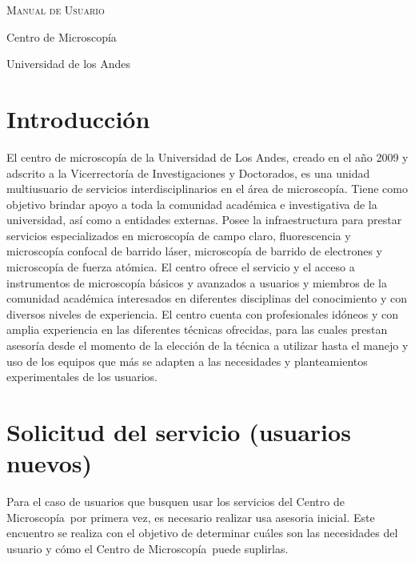 \documentclass[11pt, letter-size]{article}
\newcommand{\centro}{Centro de Microscop\'ia}
\begin{document}
	\begin{center}
		\Huge
		\scshape Manual de Usuario
		\vspace{2cm}
		
		\Large
		Centro de Microscop\'ia
		
		Universidad de los Andes
		
	\end{center}
	
	\tableofcontents
	\newpage
	
	\section{Introducción}
	El centro de microscopía de la Universidad de Los Andes, creado en el año 2009 y adscrito a la Vicerrectoría de Investigaciones y Doctorados, es una unidad multiusuario de servicios interdisciplinarios en el área de microscopía. Tiene como objetivo brindar apoyo a toda la comunidad académica e investigativa de la universidad, así como a entidades externas. Posee la infraestructura para prestar servicios especializados en microscopía de campo claro, fluorescencia y microscopía confocal de barrido láser, microscopía de barrido de electrones y microscopía de fuerza atómica. El centro ofrece el servicio y el acceso a instrumentos de microscopía básicos y avanzados a usuarios y miembros de la comunidad académica interesados en diferentes disciplinas del conocimiento y con diversos niveles de experiencia. El centro cuenta con profesionales idóneos y con amplia experiencia en las diferentes técnicas ofrecidas, para las cuales prestan asesoría desde el momento de la elección de la técnica a utilizar hasta el manejo y uso de los equipos que más se adapten a las necesidades y planteamientos experimentales de los usuarios.
	
	\section{Solicitud del servicio (usuarios nuevos)}
	Para el caso de usuarios que busquen usar los servicios del \centro\ por primera vez, es necesario realizar usa asesoria inicial. Este encuentro se realiza con el objetivo de determinar cu\'ales son las necesidades del usuario y c\'omo el \centro\ puede suplirlas.
	
\end{document}
